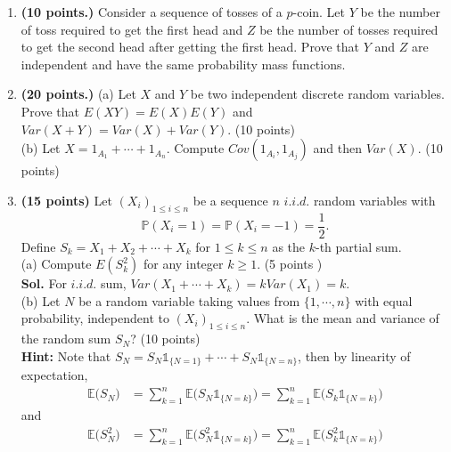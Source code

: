 \documentclass[12pt]{article}
\begin{document}
\begin{enumerate}
    \item \textbf{(10 points.)}
    Consider a sequence of tosses of a $p$-coin.
    Let $Y$ be the number of toss required to get the first head and $Z$ be the number of tosses required to get the second head after getting the first head.
    Prove that $Y$ and $Z$ are independent and have the same probability mass functions.

    \item \textbf{(20 points.)}
    (a) Let $X$ and $Y$ be two independent discrete random variables. Prove that $E(XY)=E(X)E(Y)$ and $Var(X+Y)=Var(X)+Var(Y)$. (10 points)\\
    (b) Let $X=1_{A_{1}}+\cdots + 1_{A_{n}}$. Compute $Cov(1_{A_{i}},1_{A_{j}})$ and then $Var(X)$. (10 points)

    \item \textbf{(15 points)}
    Let $(X_i)_{1\leq i\leq n}$ be a sequence $n$ $i.i.d.$ random variables with
\begin{equation*}
\mathbb{P}(X_i=1)=\mathbb{P}(X_i=-1)=\frac{1}{2}.
\end{equation*}
Define $S_k=X_1+X_2+\cdots+X_k$ for $1\leq k\leq n$ as the $k$-th partial sum.\\
(a) Compute $E(S_{k}^{2})$ for any integer $k\ge 1$. (5 points )\\
\textbf{Sol.} For $i.i.d.$ sum, $Var(X_1+\cdots+X_k)=kVar(X_1)=k$.
\\
(b) Let $N$ be a random variable taking values from $\{1,\cdots,n\}$ with equal probability, independent to $(X_i)_{1\leq i\leq n}$. What is the mean  and variance of the random sum $S_{N}$?  (10 points) \\
\textbf{Hint:} Note that $S_N=S_N\mathds{1}_{\{N=1\}}+\cdots+S_N\mathds{1}_{\{N=n\}}$, then by linearity of expectation,
\begin{equation*}
\begin{aligned}
\mathbb{E}\big(S_N\big) &= \sum_{k=1}^n\mathbb{E}\big(S_N \mathds{1}_{\{N=k\}}\big)=\sum_{k=1}^n\mathbb{E}\big(S_k \mathds{1}_{\{N=k\}}\big)
\end{aligned}
\end{equation*}
and
\begin{equation*}
\begin{aligned}
\mathbb{E}\big(S_N^2\big) &= \sum_{k=1}^n\mathbb{E}\big(S_N^2\mathds{1}_{\{N=k\}}\big)=\sum_{k=1}^n\mathbb{E}\big(S_k^2\mathds{1}_{\{N=k\}}\big)
\end{aligned}
\end{equation*}

\end{enumerate}
\end{document}
